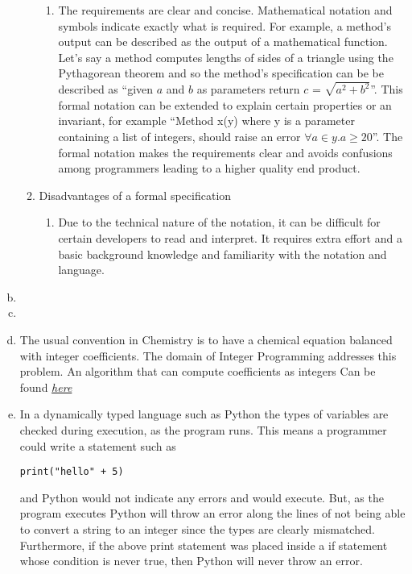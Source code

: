 \documentclass[12pt]{article}
\begin{document}
\begin{enumerate}[a)]
\begin{enumerate}
	\begin{enumerate}
		\item The requirements are clear and concise. Mathematical notation and symbols indicate exactly what is required. For example, a method's output can be described as the output of a mathematical function. Let's say a method computes lengths of sides of a triangle using the Pythagorean  theorem and so the method's specification can be be described as ``given $a$ and $b$ as parameters return $c$ = $\sqrt{a^2 + b^2}$''. This formal notation can be extended to explain certain properties or an invariant, for example ``Method x(y) where y is a parameter containing a list of integers, should raise an error $\forall a \in y. a \geq 20$''. The formal notation makes the requirements clear and avoids confusions among programmers leading to a higher quality end product.
		
	\end{enumerate}
	
	\item Disadvantages of a formal specification
	
	\begin{enumerate}
		\item Due to the technical nature of the notation, it can be difficult for certain developers to read and interpret. It requires extra effort and a basic background knowledge and familiarity with the notation and language.
	\end{enumerate}

\end{enumerate} 

\item 

\item 

\item The usual convention in Chemistry is to have a chemical equation balanced with integer coefficients. The domain of Integer Programming addresses this problem. An algorithm that can compute coefficients as integers Can be found \emph{\href{https://www.sciencedirect.com/science/article/pii/S0895717706000367}{here}}

\item In a dynamically typed language such as Python the types of variables are checked during execution, as the program runs. This means a programmer could write a statement such as \begin{verbatim}
print("hello" + 5)
\end{verbatim} and Python would not indicate any errors and would execute. But, as the program executes Python will throw an error along the lines of not being able to convert a string to an integer since the types are clearly mismatched. Furthermore, if the above print statement was placed inside a if statement whose condition is never true, then Python will never throw an error.\\


\end{enumerate}
\end{document}
